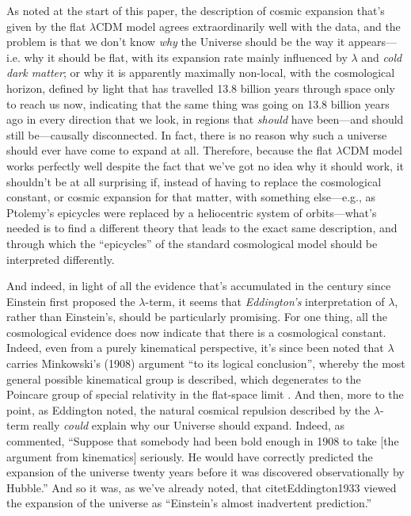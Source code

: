 \documentclass[12 pt]{article}
\begin{document}
As noted at the start of this paper, the description of cosmic expansion that's given by the flat $\lambda$CDM model agrees extraordinarily well with the data, and the problem is that we don't know \textit{why} the Universe should be the way it appears---i.e. why it should be flat, with its expansion rate mainly influenced by $\lambda$ and \textit{cold dark matter}; or why it is apparently maximally non-local, with the cosmological horizon, defined by light that has travelled 13.8 billion years through space only to reach us now, indicating that the same thing was going on 13.8 billion years ago in every direction that we look, in regions that \textit{should} have been---and should still be---causally disconnected. In fact, there is no reason why such a universe should ever have come to expand at all. Therefore, because the flat $\lambda$CDM model works perfectly well despite the fact that we've got no idea why it should work, it shouldn't be at all surprising if, instead of having to replace the cosmological constant, or cosmic expansion for that matter, with something else---e.g., as Ptolemy's epicycles were replaced by a heliocentric system of orbits---what's needed is to find a different theory that leads to the exact same description, and through which the ``epicycles'' of the standard cosmological model should be interpreted differently.

And indeed, in light of all the evidence that's accumulated in the century since Einstein first proposed the $\lambda$-term, it seems that \textit{Eddington's} interpretation of $\lambda$, rather than Einstein's, should be particularly promising. For one thing, all the cosmological evidence does now indicate that there is a cosmological constant. Indeed, even from a purely kinematical perspective, it's since been noted that $\lambda$ carries Minkowski's (1908) argument ``to its logical conclusion'', whereby the most general possible kinematical group is described, which degenerates to the Poincare group of special relativity in the flat-space limit \citep{Bacry1968,Dyson1972}. And then, more to the point, as Eddington noted, the natural cosmical repulsion described by the $\lambda$-term really \textit{could} explain why our Universe should expand. Indeed, as \citet{Dyson1972} commented, ``Suppose that somebody had been bold enough in 1908 to take [the argument from kinematics] seriously. He would have correctly predicted the expansion of the universe twenty years before it was discovered observationally by Hubble.'' And so it was, as we've already noted, that citet{Eddington1933} viewed the expansion of the universe as ``Einstein's almost inadvertent prediction.''
\end{document}
